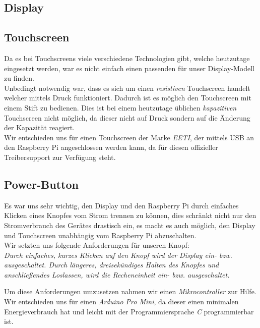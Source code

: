 \subsection{Display}



\subsection{Touchscreen}

Da es bei Touchscreens viele verschiedene Technologien gibt, welche heutzutage eingesetzt werden, war es nicht einfach einen passenden für unser Display-Modell zu finden.\\

Unbedingt notwendig war, dass es sich um einen \textit{resistiven} Touchscreen handelt welcher mittels Druck funktioniert. Dadurch ist es möglich den Touchscreen mit einem Stift zu bedienen. Dies ist bei einem heutzutage üblichen \textit{kapazitiven} Touchscreen nicht möglich, da dieser nicht auf Druck sondern auf die Änderung der Kapazität reagiert.\\

Wir entschieden uns für einen Touchscreen der Marke \textit{EETI}, der mittels USB an den Raspberry Pi angeschlossen werden kann, da für diesen offizieller Treibersupport zur Verfügung steht.\\

\subsection{Power-Button}

Es war uns sehr wichtig, den Display und den Raspberry Pi durch einfaches Klicken eines Knopfes vom Strom trennen zu können, dies schränkt nicht nur den Stromverbrauch des Gerätes drastisch ein, es macht es auch möglich, den Display und Touchscreen unabhängig vom Raspberry Pi abzuschalten.\\

Wir setzten uns folgende Anforderungen für unseren Knopf:\\
\textit{Durch einfaches, kurzes Klicken auf den Knopf wird der Display ein- bzw. ausgeschaltet.
Durch längeres, dreisekündiges Halten des Knopfes und anschließendes Loslassen, wird die Recheneinheit ein- bzw. ausgeschaltet.}

Um diese Anforderungen umzusetzen nahmen wir einen \textit{Mikrocontroller} zur Hilfe. Wir entschieden uns für einen \textit{Arduino Pro Mini}, da dieser einen minimalen Energieverbrauch hat und leicht mit der Programmiersprache \textit{C} programmierbar ist.\\

